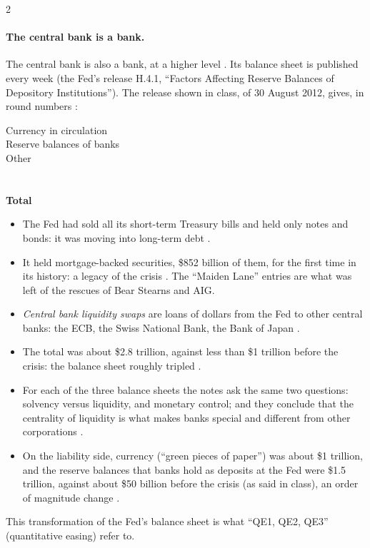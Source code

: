 \begin{paracol}{2}
\paragraph{The central bank is a bank.} The central bank is also a bank, at a higher level . Its
balance sheet is published every week (the Fed's release H.4.1, ``Factors Affecting Reserve Balances of
Depository Institutions''). The release shown in class, of 30 August 2012, gives, in round numbers
:
\begin{taccts}
%
{Currency in circulation\\Reserve balances of banks\\Other\\\\\\\textbf{Total}}
\end{taccts}
\begin{itemize}
  \item The Fed had sold all its short-term Treasury bills and held only notes and bonds: it was moving into
        long-term debt .
  \item It held mortgage-backed securities, \$852 billion of them, for the first time in its history: a legacy of
        the crisis . The ``Maiden Lane'' entries are what was left of the rescues of
        Bear Stearns and AIG.
  \item \emph{Central bank liquidity swaps} are loans of dollars from the Fed to other central banks: the ECB, the
        Swiss National Bank, the Bank of Japan .
  \item The total was about \$2.8 trillion, against less than \$1 trillion before the crisis: the balance sheet
        roughly tripled .
  \item For each of the three balance sheets the notes ask the same two questions: solvency versus liquidity, and
        monetary control; and they conclude that the centrality of liquidity is what makes banks special and
        different from other corporations .
  \item On the liability side, currency (``green pieces of paper'') was about \$1 trillion, and the reserve
        balances that banks hold as deposits at the Fed were \$1.5 trillion, against about \$50 billion before the
        crisis (as said in class), an order of magnitude change .
\end{itemize}
This transformation of the Fed's balance sheet is what ``QE1, QE2, QE3'' (quantitative easing) refer to.


\end{paracol}
